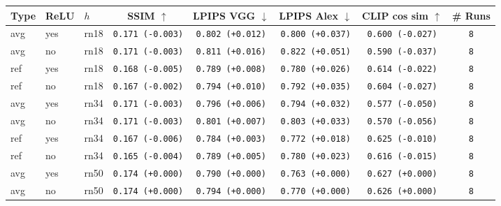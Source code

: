 \begin{tabular}{|l|l|l|c|c|c|c|c|}
\hline
Type & ReLU & $h$ & SSIM $\uparrow$ & LPIPS VGG $\downarrow$ & LPIPS Alex $\downarrow$ & CLIP cos sim $\uparrow$ & \# Runs \\
\hline
avg & yes & rn18 & \texttt{0.171 {\color{red}(-0.003)}} & \texttt{0.802 {\color{red}(+0.012)}} & \texttt{0.800 {\color{red}(+0.037)}} & \texttt{0.600 {\color{red}(-0.027)}} & \texttt{8} \\
avg & no & rn18 & \texttt{0.171 {\color{red}(-0.003)}} & \texttt{0.811 {\color{red}(+0.016)}} & \texttt{0.822 {\color{red}(+0.051)}} & \texttt{0.590 {\color{red}(-0.037)}} & \texttt{8} \\
ref & yes & rn18 & \texttt{0.168 {\color{red}(-0.005)}} & \texttt{0.789 {\color{red}(+0.008)}} & \texttt{0.780 {\color{red}(+0.026)}} & \texttt{0.614 {\color{red}(-0.022)}} & \texttt{8} \\
ref & no & rn18 & \texttt{0.167 {\color{red}(-0.002)}} & \texttt{0.794 {\color{red}(+0.010)}} & \texttt{0.792 {\color{red}(+0.035)}} & \texttt{0.604 {\color{red}(-0.027)}} & \texttt{8} \\
\hline
avg & yes & rn34 & \texttt{0.171 {\color{red}(-0.003)}} & \texttt{0.796 {\color{red}(+0.006)}} & \texttt{0.794 {\color{red}(+0.032)}} & \texttt{0.577 {\color{red}(-0.050)}} & \texttt{8} \\
avg & no & rn34 & \texttt{0.171 {\color{red}(-0.003)}} & \texttt{0.801 {\color{red}(+0.007)}} & \texttt{0.803 {\color{red}(+0.033)}} & \texttt{0.570 {\color{red}(-0.056)}} & \texttt{8} \\
ref & yes & rn34 & \texttt{0.167 {\color{red}(-0.006)}} & \texttt{0.784 {\color{red}(+0.003)}} & \texttt{0.772 {\color{red}(+0.018)}} & \texttt{0.625 {\color{red}(-0.010)}} & \texttt{8} \\
ref & no & rn34 & \texttt{0.165 {\color{red}(-0.004)}} & \texttt{0.789 {\color{red}(+0.005)}} & \texttt{0.780 {\color{red}(+0.023)}} & \texttt{0.616 {\color{red}(-0.015)}} & \texttt{8} \\
\hline
\rowcolor{verylightgray}avg & yes & rn50 & \texttt{0.174 {\color{black}(+0.000)}} & \texttt{0.790 {\color{black}(+0.000)}} & \texttt{0.763 {\color{black}(+0.000)}} & \texttt{0.627 {\color{black}(+0.000)}} & \texttt{8} \\
\rowcolor{verylightgray}avg & no & rn50 & \texttt{0.174 {\color{black}(+0.000)}} & \texttt{0.794 {\color{black}(+0.000)}} & \texttt{0.770 {\color{black}(+0.000)}} & \texttt{0.626 {\color{black}(+0.000)}} & \texttt{8} \\

\end{tabular}
